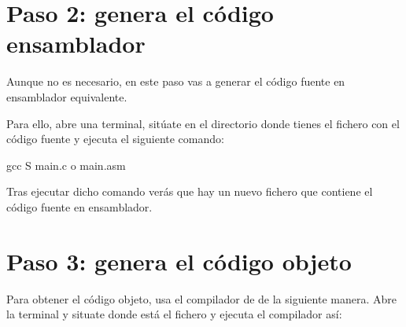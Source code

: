 \documentclass[letterpaper,10pt,spanish]{sphinxmanual}
\begin{document}
\begin{sphinxVerbatim}[commandchars=\\\{\}]
 

     
     
            
         

     
\end{sphinxVerbatim}


\section{Paso 2: genera el código ensamblador}
\label{\detokenize{lab1:paso-2-genera-el-codigo-ensamblador}}
\sphinxAtStartPar
Aunque no es necesario, en este paso vas a generar el código fuente en ensamblador equivalente.

\sphinxAtStartPar
Para ello, abre una terminal, sitúate en el directorio donde tienes el fichero con el código fuente  y ejecuta el siguiente comando:

\begin{sphinxVerbatim}[commandchars=\\\{\}]
 gcc \PYGZhy{}S main.c \PYGZhy{}o main.asm
\end{sphinxVerbatim}

\sphinxAtStartPar
Tras ejecutar dicho comando verás que hay un nuevo fichero  que contiene el código fuente en ensamblador.


\section{Paso 3: genera el código objeto}
\label{\detokenize{lab1:paso-3-genera-el-codigo-objeto}}
\sphinxAtStartPar
Para obtener el código objeto, usa el compilador de  de la siguiente manera. Abre la terminal y situate donde está el fichero  y ejecuta el compilador así:
\end{document}
